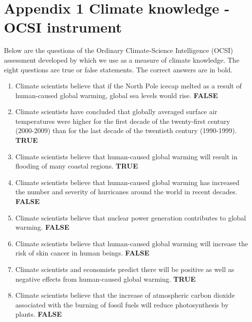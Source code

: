\documentclass[a4paper,12pt]{article}
\begin{document}
\newpage


\setcounter{table}{0} 
\makeatletter 
\renewcommand{\thetable}{A\@arabic \c@table} 
\FloatBarrier


\section{Appendix 1 Climate knowledge - OCSI instrument}

Below are the questions of the Ordinary Climate-Science Intelligence (OCSI) assessment developed by \cite{Kahan2015} which we use as a measure of climate knowledge. The eight questions are true or false statements. The correct answers are in bold.

\begin{enumerate}

\item Climate scientists believe that if the North Pole icecap melted as a result of human-caused global warming, global sea levels would rise.  \textbf{FALSE}

\item Climate scientists have concluded
that globally averaged surface air
temperatures were higher for the 
first decade of the twenty-first
century (2000-2009) than for the last decade of the twentieth
century (1990-1999).   \textbf{TRUE}

\item Climate scientists believe that
human-caused global warming
will result in flooding of many
coastal regions. \textbf{TRUE}

\item Climate scientists believe that
human-caused global warming
has increased the number and
severity of hurricanes around the
world in recent decades. \textbf{FALSE}


\item Climate scientists believe that
nuclear power generation
contributes to global warming.  \textbf{FALSE}


\item Climate scientists believe that
human-caused global warming
will increase the risk of skin cancer in human beings.  \textbf{FALSE}

\item Climate scientists and economists
predict there will be positive as
well as negative effects from
human-caused global warming. \textbf{TRUE}


\item Climate scientists believe that the
increase of atmospheric carbon
dioxide associated with the
burning of fossil fuels will reduce
photosynthesis by plants.  \textbf{FALSE}

\end{enumerate}
\end{document}
